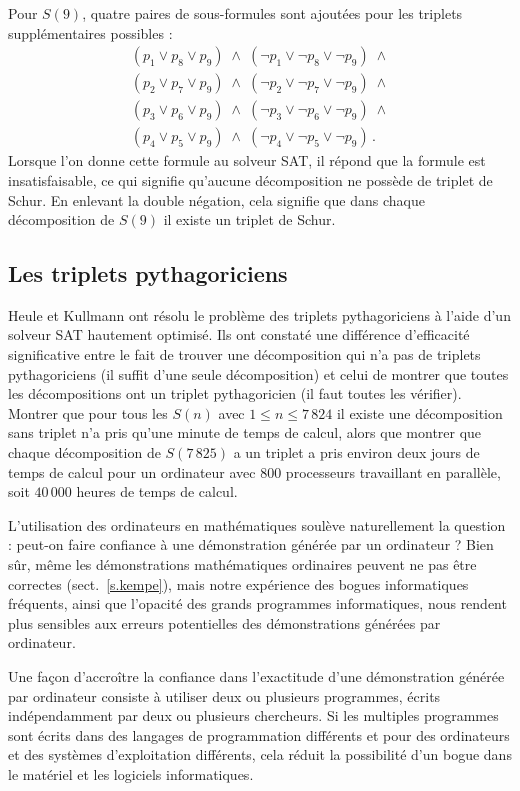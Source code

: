 Pour $S(9)$, quatre paires de sous-formules sont ajoutées pour les triplets supplémentaires possibles :
\[
\begin{array}{l}
(p_1 \vee p_8 \vee p_9) \;\wedge\; (\neg p_1 \vee \neg p_8 \vee \neg p_9) \;\wedge \\
(p_2 \vee p_7 \vee p_9) \;\wedge\; (\neg p_2 \vee \neg p_7 \vee \neg p_9) \;\wedge \\
(p_3 \vee p_6 \vee p_9) \;\wedge\; (\neg p_3 \vee \neg p_6 \vee \neg p_9) \;\wedge \\
(p_4 \vee p_5 \vee p_9) \;\wedge\; (\neg p_4 \vee \neg p_5 \vee \neg p_9)\,.
\end{array}
\]
Lorsque l'on donne cette formule au solveur SAT, il répond que la formule est insatisfaisable, ce qui signifie qu'aucune décomposition ne possède de triplet de Schur. En enlevant la double négation, cela signifie que dans chaque décomposition de $S(9)$ il existe un triplet de Schur.

\subsection{Les triplets pythagoriciens}

Heule et Kullmann ont résolu le problème des triplets pythagoriciens à l'aide d'un solveur SAT hautement optimisé. Ils ont constaté une différence d'efficacité significative entre le fait de trouver une décomposition qui n'a pas de triplets pythagoriciens (il suffit d'une seule décomposition) et celui de montrer que toutes les décompositions ont un triplet pythagoricien (il faut toutes les vérifier). Montrer que pour tous les $S(n)$ avec $1\leq n\leq 7\,824$ il existe une décomposition sans triplet n'a pris qu'une minute de temps de calcul, alors que montrer que chaque décomposition de $S(7\,825)$ a un triplet a pris environ deux jours de temps de calcul pour un ordinateur avec $800$ 
 processeurs travaillant en parallèle, soit $40\,000$ heures de temps de calcul.

L'utilisation des ordinateurs en mathématiques soulève naturellement la question : peut-on faire confiance à une démonstration générée par un ordinateur ? Bien sûr, même les démonstrations mathématiques \og ordinaires\fg{} peuvent ne pas être correctes (sect.~\ref{s.kempe}), mais notre expérience des bogues informatiques fréquents, ainsi que l'opacité des grands programmes informatiques, nous rendent plus sensibles aux erreurs potentielles des démonstrations générées par ordinateur.

Une façon d'accroître la confiance dans l'exactitude d'une démonstration générée par ordinateur consiste à utiliser deux ou plusieurs programmes, écrits indépendamment par deux ou plusieurs chercheurs. Si les multiples programmes sont écrits dans des langages de programmation différents et pour des ordinateurs et des systèmes d'exploitation différents, cela réduit la possibilité d'un bogue dans le matériel et les logiciels informatiques.

